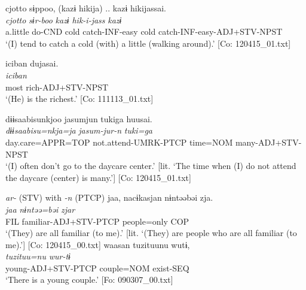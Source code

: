 \ex \label{ex:9.46c} %
    \glll  {\textbar}cjotto{\textbar}  sɨppoo,  (kazɨ  hikija)  ..  kazɨ  hikijassai.\\
      \textit{cjotto}  \textit{sɨr-boo}  \textit{kazɨ}  \textit{hik-i-jass}    \textit{kazɨ} \textit{}\\
      a.little  do-CND  cold  catch-INF-easy    cold  catch-INF-easy-ADJ+STV-NPST\\
      \glt       ‘(I) tend to catch a cold (with) a little (walking around).’ [Co: 120415\_01.txt]

\ex \label{ex:9.46d} %
 \glll  {\textbar}iciban{\textbar}  dujasai.\\
      \textit{iciban}  \textit{}\\
      most  rich-ADJ+STV-NPST\\
      \glt       ‘(He) is the richest.’ [Co: 111113\_01.txt]

\ex \label{ex:9.46e} %
\glll {\textbar}dɨɨsaabisu{\textbar}nkjoo  jasumjun  tukiga  huusai.\\
      \textit{dɨɨsaabisu=nkja=ja}  \textit{jasum-jur-n}  \textit{tuki=ga}  \textit{}\\
      day.care=APPR=TOP  not.attend-UMRK-PTCP  time=NOM   many-ADJ+STV-NPST\\      
      \glt ‘(I) often don’t go to the daycare center.’ [lit. ‘The time when (I) do not attend the daycare (center) is many.’]    [Co: 120415\_01.txt]

\exi{} \textit{ar-} (STV) with \textit{{}-n} (PTCP)
\ex\label{ex:9.46f} %
  \glll  jaa,  nacɨkasjan  nɨntəəbəi  zja.\\
      \textit{jaa}  \textit{}  \textit{nɨntəə=bəi}  \textit{zjar}\\
      FIL  familiar-ADJ+STV-PTCP  people=only  COP\\
      \glt       ‘(They) are all familiar (to me).’ [lit. ‘(They) are people who are all familiar (to me).’] [Co: 120415\_00.txt]
\ex\label{ex:9.46g}%
\glll  waasan  tuzituunu  wutɨ,\\
      \textit{}  \textit{tuzituu=nu}  \textit{wur-tɨ}\\
      young-ADJ+STV-PTCP  couple=NOM  exist-SEQ\\
      \glt       ‘There is a young couple.’ [Fo: 090307\_00.txt]

